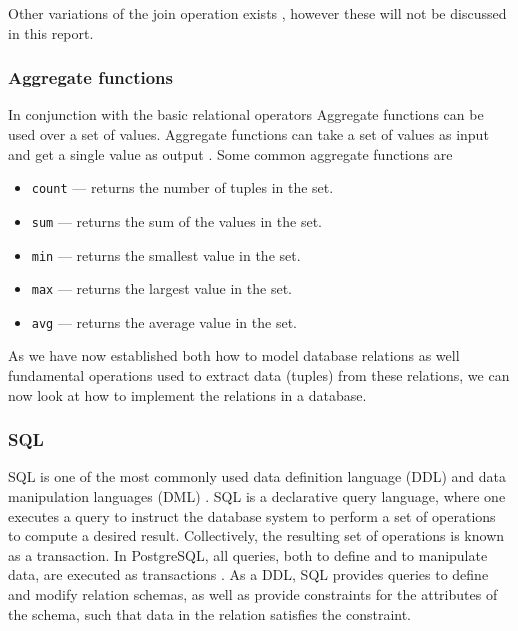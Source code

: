 Other variations of the join operation exists \cite{DBSBook}, however these will not be discussed in this report.\\
\subsubsection*{Aggregate functions}
In conjunction with the basic relational operators Aggregate functions can be used over a set of values.
Aggregate functions can take a set of values as input and get a single value as output \cite{DBSBook}. Some common aggregate functions are 
\begin{itemize} \label{aggregateFunctions}
    \item \texttt{count} --- returns the number of tuples in the set.
    \item \texttt{sum} --- returns the sum of the values in the set.
    \item \texttt{min} --- returns the smallest value in the set.
    \item \texttt{max} --- returns the largest value in the set.
    \item \texttt{avg} --- returns the average value in the set.
\end{itemize}


As we have now established both how to model database relations as well fundamental operations used to extract data (tuples) from these relations, we can now look at how to implement the relations in a database.

\subsubsection{SQL}\label{sec:SQL}
SQL is one of the most commonly used data definition language (DDL) and data manipulation languages (DML) \cite{DBSBook}.
SQL is a declarative query language, where one executes a query to instruct the database system to perform a set of operations to compute a desired result. 
Collectively, the resulting set of operations is known as a transaction.
In PostgreSQL, all queries, both to define and to manipulate data, are executed as transactions \cite{postgres_transactions}.
As a DDL, SQL provides queries to define and modify relation schemas, as well as provide constraints for the attributes of the schema, such that data in the relation satisfies the constraint.  

